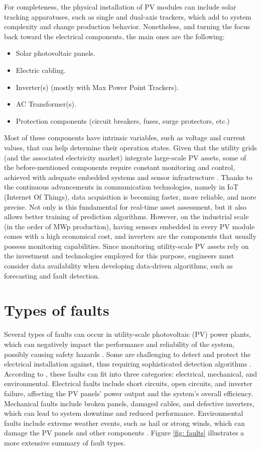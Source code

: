 For completeness, the physical installation of PV modules can include solar tracking apparatuses, such as single and dual-axis trackers, which add to system complexity and change production behavior. Nonetheless, and turning the focus back toward the electrical components, the main ones are the following:

\begin{itemize}
    \item Solar photovoltaic panels.
    \item Electric cabling.
    \item Inverter(s) (mostly with Max Power Point Trackers).
    \item AC Transformer(s).
    \item Protection components (circuit breakers, fuses, surge protectors,
    etc.)
\end{itemize}

Most of these components have intrinsic variables, such as voltage and current values, that can help determine their operation states. Given that the utility grids (and the associated electricity market) integrate large-scale PV assets, some of the before-mentioned components require constant monitoring and control, achieved with adequate embedded systems and sensor infrastructure \cite{AIPV}. Thanks to the continuous advancements in communication technologies, namely in IoT (Internet Of Things), data acquisition is becoming faster, more reliable, and more precise. Not only is this fundamental for real-time asset assessment, but it also allows better training of prediction algorithms. However, on the industrial scale (in the order of MWp production), having sensors embedded in every PV module comes with a high economical cost, and inverters are the components that usually possess monitoring capabilities. Since monitoring utility-scale PV assets rely on the investment and technologies employed for this purpose,  engineers must consider data availability when developing data-driven algorithms, such as forecasting and fault detection.

\section{Types of faults}

Several types of faults can occur in utility-scale photovoltaic (PV) power plants, which can negatively impact the performance and reliability of the system, possibly causing safety hazards \cite{Alam2015}. Some are challenging to detect and protect the electrical installation against, thus requiring sophisticated detection algorithms \cite{Pillai2018}. According to \cite{Pillai2018}, these faults can fit into three categories: electrical, mechanical, and environmental. Electrical faults include short circuits, open circuits, and inverter failure, affecting the PV panels' power output and the system's overall efficiency. Mechanical faults include broken panels, damaged cables, and defective inverters, which can lead to system downtime and reduced performance. Environmental faults include extreme weather events, such as hail or strong winds, which can damage the PV panels and other components \cite{faults}. Figure \ref{fig: faults} illustrates a more extensive summary of fault types.

